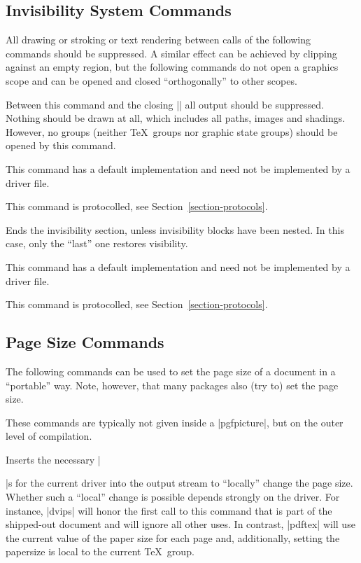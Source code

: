 \subsection{Invisibility System Commands}

All drawing or stroking or text rendering between calls of the
following commands should be suppressed. A similar effect can be
achieved by clipping against an empty region, but the following
commands do not open a graphics scope and can be opened and closed
``orthogonally'' to other scopes.

\begin{command}{\pgfsys@begininvisible}
  Between this command and the closing |\pgfsys@endinvisible| all
  output should be suppressed. Nothing should be drawn at all, which
  includes all paths, images and shadings. However, no groups (neither
  \TeX\ groups nor graphic state groups) should be opened by this
  command.

  This command has a default implementation and need not be
  implemented by a driver file.

  This command is protocolled, see Section~\ref{section-protocols}.
\end{command}

\begin{command}{\pgfsys@endinvisible}
  Ends the invisibility section, unless invisibility blocks have been
  nested. In this case, only the ``last'' one restores visibility.

  This command has a default implementation and need not be
  implemented by a driver file.

  This command is protocolled, see Section~\ref{section-protocols}.
\end{command}



\subsection{Page Size Commands}

The following commands can be used to set the page size of a document
in a ``portable'' way. Note, however, that many packages also (try to)
set the page size.

These commands are typically not given inside a |{pgfpicture}|, but on
the outer level of compilation.

\begin{command}{\pgfsys@papersize{}}
  Inserts the necessary |\special|s for the current driver into the
  output stream to ``locally'' change the page size. Whether such a
  ``local'' change is possible depends strongly on the driver. For
  instance, |dvips| will honor the first call to this command that is
  part of the shipped-out document and will ignore all other uses. In
  contrast, |pdftex| will use the current value of the paper size for
  each page and, additionally, setting the papersize is local to the
  current \TeX\ group.
\end{command}

